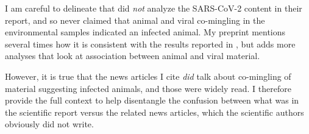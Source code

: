 \documentclass[9pt,twocolumn,twoside]{gsajnl_modified}
\begin{document}
\begin{enumerate}
\begin{enumerate}[label=\alph*)]
{
\color{black}
I am careful to delineate that \citet{crits2023genetic} did \emph{not} analyze the SARS-CoV-2 content in their report, and so never claimed that animal and viral co-mingling in the environmental samples indicated an infected animal.
My preprint mentions several times how it is consistent with the results reported in \citet{crits2023genetic}, but adds more analyses that look at association between animal and viral material.

However, it is true that the news articles I cite \emph{did} talk about co-mingling of material suggesting infected animals, and those were widely read.
I therefore provide the full context to help disentangle the confusion between what was in the scientific report versus the related news articles, which the scientific authors obviously did not write.
}

\end{enumerate}

\end{enumerate}
\end{document}
